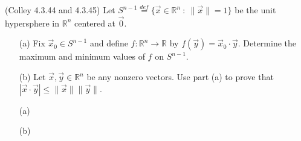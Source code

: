 \documentclass[11pt,letterpaper,cm]{nupset}
\begin{document}
\begin{problem}[Exercise 5] (Colley 4.3.44 and 4.3.45) Let $S^{n-1}\stackrel{def}{=}\{\vec{x}\in\mathbb{R}^n\ :\ \|\vec{x}\|=1\}$ be the unit hypersphere in $\mathbb{R}^n$ centered at $\vec{0}$. 
	\begin{itemize}
		\item[(a)] Fix $\vec{x}_0\in S^{n-1}$ and define $f:\mathbb{R}^n\to\mathbb{R}$ by $f(\vec{y})=\vec{x}_0\cdot\vec{y}$.  Determine the maximum and minimum values of $f$ on $S^{n-1}$.
		\item[(b)] Let $\vec{x},\vec{y}\in\mathbb{R}^n$ be any nonzero vectors.  Use part (a) to prove that $|\vec{x}\cdot\vec{y}|\leq \|\vec{x}\|\|\vec{y}\|$.
	\end{itemize}
\end{problem}
\begin{solution}
	\begin{itemize}
		\item[(a)]
		\item[(b)]
	\end{itemize}
\end{solution}
\end{document}
